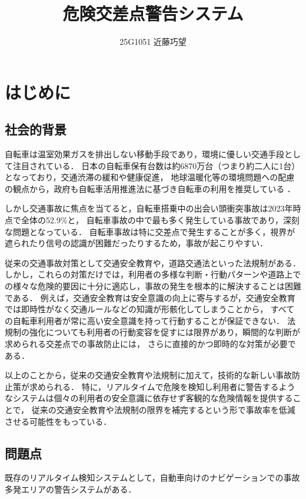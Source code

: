 \documentclass[uplatex,dvipdfmx]{jsarticle}
\begin{document}
\title{危険交差点警告システム}
\author{25G1051 近藤巧望}
\maketitle

\section{はじめに}

\subsection{社会的背景}
自転車は温室効果ガスを排出しない移動手段であり，環境に優しい交通手段として注目されている．
日本の自転車保有台数は約6870万台（つまり約二人に1台）となっており，交通渋滞の緩和や健康促進，
地球温暖化等の環境問題への配慮の観点から，政府も自転車活用推進法に基づき自転車の利用を推奨している
\cite{ref:koutuusyou_1,ref:koutuusyou_2}．

しかし交通事故に焦点を当てると，自転車搭乗中の出会い頭衝突事故は2023年時点で全体の52.9\%と，
自転車事故の中で最も多く発生している事故であり，深刻な問題となっている\cite{ref:sonpo_1}．
自転車事故は特に交差点で発生することが多く，視界が遮られたり信号の認識が困難だったりするため，事故が起こりやすい．

従来の交通事故対策として交通安全教育や，道路交通法といった法規制がある．
しかし，これらの対策だけでは，利用者の多様な判断・行動パターンや道路上での様々な危険的要因に十分に適応し，事故の発生を根本的に解決することは困難である．
例えば，交通安全教育は安全意識の向上に寄与するが，交通安全教育では即時性がなく交通ルールなどの知識が形骸化してしまうことから，
すべての自転車利用者が常に高い安全意識を持って行動することが保証できない．
法規制の強化についても利用者の行動変容を促すには限界があり，瞬間的な判断が求められる交差点での事故防止には，
さらに直接的かつ即時的な対策が必要である．

以上のことから，従来の交通安全教育や法規制に加えて，技術的な新しい事故防止策が求められる．
特に，リアルタイムで危険を検知し利用者に警告するようなシステムは個々の利用者の安全意識に依存せず客観的な危険情報を提供することで，
従来の交通安全教育や法規制の限界を補完するという形で事故率を低減させる可能性をもっている．

\subsection{問題点}
既存のリアルタイム検知システムとして，自動車向けのナビゲーションでの事故多発エリアの警告システムがある．
\end{document}
